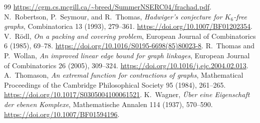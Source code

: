 \documentclass[11pt]{article}
\begin{document}
\begin{thebibliography}{99}
\url{https://cgm.cs.mcgill.ca/~breed/SummerNSERC04/frachad.pdf}.
 N.~Robertson, P.~Seymour, and R.~Thomas,
\emph{Hadwiger's conjecture for $K_6$-free graphs},
Combinatorica 13 (1993), 279--361.
\url{https://doi.org/10.1007/BF01202354}.
 V.~R\"odl,
\emph{On a packing and covering problem},
European Journal of Combinatorics 6 (1985), 69--78.
\url{https://doi.org/10.1016/S0195-6698(85)80023-8}.
 R.~Thomas and P.~Wollan,
\emph{An improved linear edge bound for graph linkages},
European Journal of Combinatorics 26 (2005), 309--324.
\url{https://doi.org/10.1016/j.ejc.2004.02.013}.
 A.~Thomason,
\emph{An extremal function for contractions of graphs},
Mathematical Proceedings of the Cambridge Philosophical Society
95 (1984), 261--265.
\url{https://doi.org/10.1017/S0305004100061521}.
 K.~Wagner,
\emph{\"Uber eine Eigenschaft der ebenen Komplexe},
Mathematische Annalen 114 (1937), 570--590.
\url{https://doi.org/10.1007/BF01594196}.
\end{thebibliography}
\end{document}
